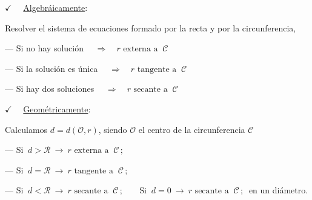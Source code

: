 $\checkmark \quad$ \underline{Algebráicamente}:

Resolver el sistema de ecuaciones formado por la recta y por la circunferencia,

\hspace{2cm} --- Si no hay solución $\quad \Rightarrow \quad r \text{ externa a } \ \mathcal C$ 

\hspace{2cm} --- Si la solución es única $\quad \Rightarrow \quad r \text{ tangente a } \ \mathcal C$

\hspace{2cm} --- Si hay dos soluciones $\quad \Rightarrow \quad r \text{ secante a } \ \mathcal C$

\vspace{4mm} $\checkmark \quad$ \underline{Geométricamente}:

Calculamos $d=d(\mathcal O, r)$, siendo $\mathcal O$ el centro de la circunferencia $\mathcal C$

\hspace{1cm}--- Si $\ d>\mathcal R \ \to \ r \text{ externa a } \ \mathcal C\, ; \ $ 

\hspace{1cm}--- Si $\ d=\mathcal R \ \to \ r \text{ tangente a } \ \mathcal C\, ; \ $ 

\hspace{1cm}--- Si $\ d<\mathcal R \ \to \ r \text{ secante a } \ \mathcal C\, ; \ $ 
$\quad$  Si $\ d=0 \ \to \ r \text{ secante a } \ \mathcal C\, ; \ $  en un diámetro.

\vspace{5mm}

